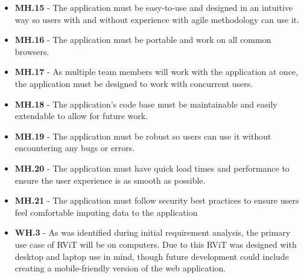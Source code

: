 \documentclass[l4proj.tex]{subfiles}
\begin{document}
\begin{itemize}
    \item \textbf{MH.15} - The application must be easy-to-use and designed in an intuitive way so users with and without experience with agile methodology can use it. 
    \item \textbf{MH.16} - The application must be portable and work on all common browsers.
    \item \textbf{MH.17} - As multiple team members will work with the application at once, the application must be designed to work with concurrent users.
    \item \textbf{MH.18} - The application's code base must be maintainable and easily extendable to allow for future work.
    \item \textbf{MH.19} - The application must be robust so users can use it without encountering any bugs or errors.
    \item \textbf{MH.20} - The application must have quick load times and performance to ensure the user experience is as smooth as possible. 
    \item \textbf{MH.21} - The application must follow security best practices to ensure users feel comfortable imputing data to the application\\

    \item \textbf{WH.3} - As was identified during initial requirement analysis, the primary use case of RViT will be on computers. Due to this RViT was designed with desktop and laptop use in mind, though future development could include creating a mobile-friendly version of the web application.
\end{itemize}
\end{document}
